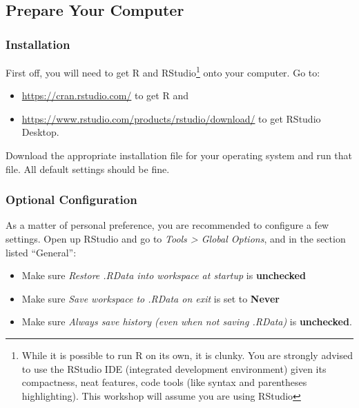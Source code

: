 \documentclass[]{book}
\providecommand{\tightlist}{%
  \setlength{\itemsep}{0pt}\setlength{\parskip}{0pt}}
\let\rmarkdownfootnote\footnote%
\def\footnote{\protect\rmarkdownfootnote}
\theoremstyle{definition}
\theoremstyle{definition}
\theoremstyle{definition}
\theoremstyle{remark}
\begin{document}
\hypertarget{comp-prep}{\subsection*{Prepare Your
Computer}\label{comp-prep}}

\subsubsection*{Installation}\label{install}

First off, you will need to get R and RStudio\footnote{While it is
  possible to run R on its own, it is clunky. You are strongly advised
  to use the RStudio IDE (integrated development environment) given its
  compactness, neat features, code tools (like syntax and parentheses
  highlighting). This workshop will assume you are using RStudio} onto
your computer. Go to:

\begin{itemize}
\tightlist
\item
  \url{https://cran.rstudio.com/} to get R and
\item
  \url{https://www.rstudio.com/products/rstudio/download/} to get
  RStudio Desktop.
\end{itemize}

Download the appropriate installation file for your operating system and
run that file. All default settings should be fine.

\subsubsection*{Optional Configuration}\label{optional-configuration}

As a matter of personal preference, you are recommended to configure a
few settings. Open up RStudio and go to \emph{Tools \textgreater{}
Global Options}, and in the section listed ``General'':

\begin{itemize}
\tightlist
\item
  Make sure \emph{Restore .RData into workspace at startup} is
  \textbf{unchecked}
\item
  Make sure \emph{Save workspace to .RData on exit} is set to
  \textbf{Never}
\item
  Make sure \emph{Always save history (even when not saving .RData)} is
  \textbf{unchecked}.
\end{itemize}
\end{document}
